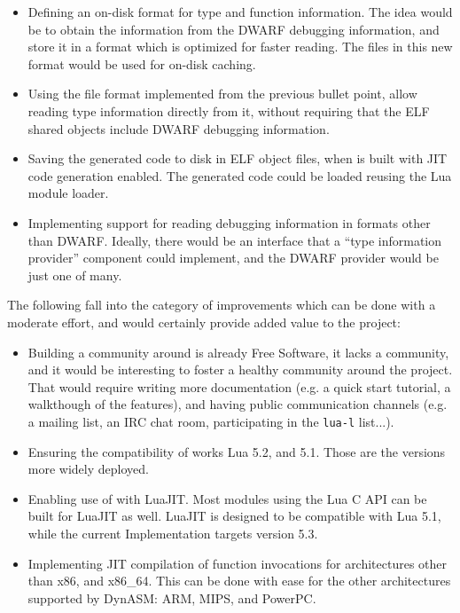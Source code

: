 \begin{itemize}

	\item Defining an on-disk format for type and function information. The
	idea would be to obtain the information from the DWARF debugging
	information, and store it in a format which is optimized for faster
	reading. The files in this new format would be used for on-disk caching.

	\item Using the file format implemented from the previous bullet point,
	allow reading type information directly from it, without requiring that
	the ELF shared objects include DWARF debugging information.

	\item Saving the generated code to disk in ELF object files, when \Eol* is
	built with JIT code generation enabled.	The generated code could be loaded
	reusing the Lua module loader.

	\item Implementing support for reading debugging information in formats
	other than DWARF. Ideally, there would be an interface that a “type
	information provider” component could implement, and the DWARF provider
	would be just one of many.

\end{itemize}

The following fall into the category of improvements which can be done with
a moderate effort, and would certainly provide added value to the project:


\begin{itemize}

	\item Building a community around \Eol* is already Free Software, it lacks
	a community, and it would be interesting to foster a healthy community
	around the project. That would require writing more documentation (e.g.
	a quick start tutorial, a walkthough of the features), and having public
	communication channels (e.g. a mailing list, an \gls{IRC} chat room,
	participating in the \verb|lua-l| list...).

	\item Ensuring the compatibility of \Eol* works Lua 5.2, and 5.1. Those
	are the versions more widely deployed.

	\item Enabling use of \Eol* with LuaJIT. Most modules using the Lua C API
	can be built for LuaJIT as well. LuaJIT is designed to be compatible with
	Lua	5.1, while the current Implementation targets version 5.3.

	\item Implementing JIT compilation of function invocations for
	architectures other than x86, and x86\_64. This can be done with ease for
	the other architectures supported by DynASM: ARM, MIPS, and PowerPC.

\end{itemize}


